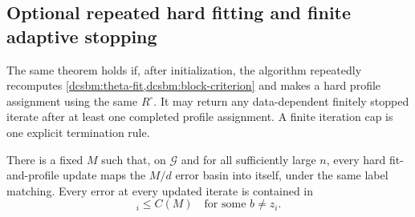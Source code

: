 \subsection{Optional repeated hard fitting and finite adaptive stopping}

The same theorem holds if, after initialization, the algorithm
repeatedly recomputes \cref{dcsbm:theta-fit,dcsbm:block-criterion}
and makes a hard profile assignment using the same \(R^\circ\).
It may return any data-dependent finitely stopped iterate after
at least one completed profile assignment.  A finite iteration
cap is one explicit termination rule.

\begin{lemma}
\label{dcsbm:basin}
There is a fixed \(M\) such that, on \(\mathcal G\) and for all
sufficiently large \(n\), every hard fit-and-profile update maps
the \(M/d\) error basin into itself, under the same label matching.
Every error at every updated iterate is contained in
\begin{equation}
 [R^\circ w_{i,ab}]_i\le C(M)
 \quad\text{for some }b\ne z_i .
 \label{dcsbm:common-error-event}
\end{equation}
\end{lemma}

